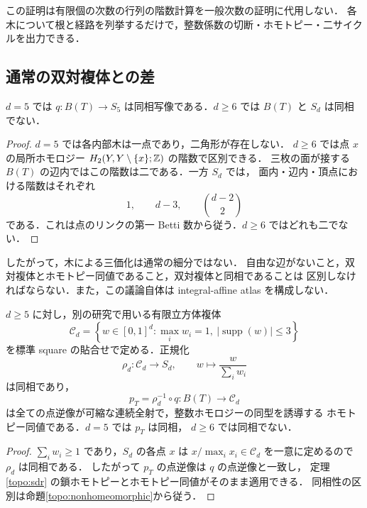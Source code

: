 この証明は有限個の次数の行列の階数計算を一般次数の証明に代用しない．
各木について根と経路を列挙するだけで，整数係数の切断・ホモトピー・二サイクルを出力できる．

\subsection{通常の双対複体との差}

\begin{proposition}\label{topo:nonhomeomorphic}
$d=5$ では $q:B(T)\to S_5$ は同相写像である．$d\geq6$ では
$B(T)$ と $S_d$ は同相でない．
\end{proposition}

\begin{proof}
$d=5$ では各内部木は一点であり，二角形が存在しない．
$d\geq6$ では点 $x$ の局所ホモロジー
$H_2(Y,Y\setminus\{x\};\mathbb Z)$ の階数で区別できる．
三枚の面が接する $B(T)$ の辺内ではこの階数は二である．一方 $S_d$ では，
面内・辺内・頂点における階数はそれぞれ
\[
 1,\qquad d-3,\qquad \binom{d-2}{2}
\]
である．これは点のリンクの第一 Betti 数から従う．$d\geq6$ ではどれも二でない．
\end{proof}

したがって，木による三価化は通常の細分ではない．
自由な辺がないこと，双対複体とホモトピー同値であること，双対複体と同相であることは
区別しなければならない．また，この議論自体は integral-affine atlas を構成しない．

\begin{corollary}
\label{topo:KE-cubical-comparison}
$d\ge5$ に対し，別の研究で用いる有限立方体複体
\[
 \mathcal C_d=
 \left\{w\in[0,1]^d:\max_i w_i=1,\ 
             |\operatorname{supp}(w)|\le3\right\}
\]
を標準 square の貼合せで定める．正規化
\[
 \rho_d:\mathcal C_d\longrightarrow S_d,\qquad
 w\longmapsto\frac{w}{\sum_iw_i}
\]
は同相であり，
\[
 p_T=\rho_d^{-1}\circ q:B(T)\longrightarrow\mathcal C_d
\]
は全ての点逆像が可縮な連続全射で，整数ホモロジーの同型を誘導する
ホモトピー同値である．$d=5$ では $p_T$ は同相，
$d\ge6$ では同相でない．
\end{corollary}
\begin{proof}
$\sum_iw_i\ge1$ であり，$S_d$ の各点 $x$ は
$x/\max_i x_i\in\mathcal C_d$ を一意に定めるので $\rho_d$ は同相である．
したがって $p_T$ の点逆像は $q$ の点逆像と一致し，
定理\ref{topo:sdr} の鎖ホモトピーとホモトピー同値がそのまま適用できる．
同相性の区別は命題\ref{topo:nonhomeomorphic}から従う．
\end{proof}

